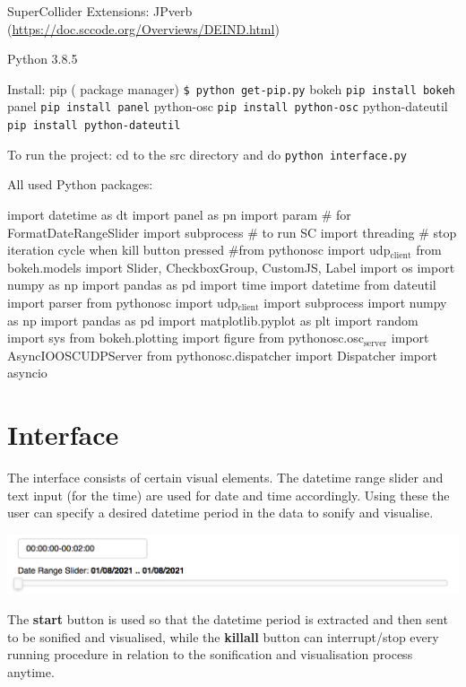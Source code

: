 \documentclass[11pt]{article}
\begin{document}
SuperCollider Extensions: JPverb (\url{https://doc.sccode.org/Overviews/DEIND.html})

Python 3.8.5

Install:
pip ( package manager) \texttt{\$ python get-pip.py}
bokeh \texttt{pip install bokeh}
panel \texttt{pip install panel}
python-osc \texttt{pip install python-osc}
python-dateutil \texttt{pip install python-dateutil}

To run the project: cd to the src directory and do \texttt{python interface.py}

All used Python packages:

import datetime as dt
import panel as pn
import param  \# for FormatDateRangeSlider
import subprocess  \# to run SC
import threading  \# stop iteration cycle when kill button pressed
\#from pythonosc import udp\(_{\text{client}}\)
from bokeh.models import Slider, CheckboxGroup, CustomJS, Label
import os
import numpy as np
import pandas as pd
import time
import datetime
from dateutil import parser
from pythonosc import udp\(_{\text{client}}\)
import subprocess
import numpy as np
import pandas as pd
import matplotlib.pyplot as plt
import random
import sys
from bokeh.plotting import figure
from pythonosc.osc\(_{\text{server}}\) import AsyncIOOSCUDPServer
from pythonosc.dispatcher import Dispatcher
import asyncio

\section{Interface}
\label{sec:org796e71c}
The interface consists of certain visual elements.
The datetime range slider and text input (for the time) are used for date and time accordingly. Using these the user can specify a desired datetime period in the data to sonify and visualise.

\begin{center}
\includegraphics[width=.9\linewidth]{./datetime_selection.png}
\end{center}

The \textbf{start} button is used so that the datetime period is extracted and then sent to be sonified and visualised, while the \textbf{killall} button can interrupt/stop every running procedure in relation to the sonification and visualisation process anytime.
\end{document}
